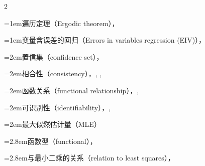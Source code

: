 \begin{multicols}{2}
\par\addvspace{2pt}
\par\noindent\hangindent=1em\hspace*{0em}\label{idx:406}遍历定理（Ergodic theorem），\hyperref[idxocc:406:250]{\pageref*{idxocc:406:250}}\par
\par\addvspace{2pt}
\par\noindent\hangindent=1em\hspace*{0em}\label{idx:407}变量含误差的回归（Errors in variables regression (EIV)），\hyperref[sec:12.2]{\pageref*{sec:12.2}}\par
\par\noindent\hangindent=2em\hspace*{1em}\label{idx:408}置信集（confidence set），\hyperref[sec:12.2.4]{\pageref*{sec:12.2.4}}\par
\par\noindent\hangindent=2em\hspace*{1em}\label{idx:409}相合性（consistency），\hyperref[idxocc:409:505]{\pageref*{idxocc:409:505}}, \hyperref[idxocc:409:507]{\pageref*{idxocc:409:507}}, \hyperref[sec:12.6.2]{\pageref*{sec:12.6.2}}\par
\par\noindent\hangindent=2em\hspace*{1em}\label{idx:410}函数关系（functional relationship），\hyperref[eq:12.2.5]{\pageref*{eq:12.2.5}}, \hyperref[sec:12.6.1]{\pageref*{sec:12.6.1}}\par
\par\noindent\hangindent=2em\hspace*{1em}\label{idx:411}可识别性（identifiability），\hyperref[idxocc:411:501]{\pageref*{idxocc:411:501}}, \hyperref[idxocc:411:506]{\pageref*{idxocc:411:506}}\par
{}
\par\noindent\hangindent=2em\hspace*{1em}\label{idx:412}最大似然估计量（MLE）\par
\par\noindent\hangindent=2.8em\hspace*{1.8em}\label{idx:413}函数型（functional），\hyperref[eq:12.2.16]{\pageref*{eq:12.2.16}}\par
\par\noindent\hangindent=2.8em\hspace*{1.8em}\label{idx:414}与最小二乘的关系（relation to least squares），\hyperref[exercise:12.4]{\pageref*{exercise:12.4}}\par

\end{multicols}
